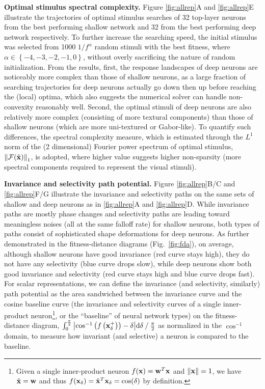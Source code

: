 \documentclass[10pt,twocolumn,letterpaper]{article}
\begin{document}
{\bf Optimal stimulus spectral complexity.} Figure \ref{fig:allrep}A and \ref{fig:allrep}E illustrate the trajectories of optimal stimulus searches of 32 top-layer neurons from the best performing shallow network and 32 from the best performing deep network respectively.
To further increase the searching speed, the initial stimulus {was} selected from 1000 ${1}/{f^{\alpha}}$ random stimuli with the best fitness, where $\alpha \in \left\lbrace -4,-3,-2,-1,0 \right\rbrace$, without overly sacrificing the nature of random initialization.
From the results, first, the response landscapes of deep neurons are noticeably more complex than those of shallow neurons, as a large fraction of searching trajectories for deep neurons actually go down then up before reaching the (local) optima, which also suggests the numerical solver can handle non-convexity reasonably well.
Second, the optimal stimuli of deep neurons are also relatively more complex (\ie consisting of more textural components) than those of shallow neurons (which are more uni-textured or Gabor-like).
To quantify such differences, the spectral complexity measure, which is estimated through the $L^{1}$ norm of the (2 dimensional) Fourier power spectrum of optimal stimulus, \ie $\left\| \mathcal{F}(\hat{\bf{x}}) \right\|_{1}$, is adopted, where higher value suggests higher non-sparsity (\ie more spectral components required to represent the visual stimuli).

\newcommand{\defbaseline}{Given a single inner-product neuron $f({\bf{x}}) = {\bf{w}}^{T}{\bf{x}}$ and $\left\| \bf{x} \right\| = 1$, we have $\hat{\bf{x}} = \bf{w}$ and thus $f({\bf{x}}_{\delta}) = {\hat{\bf{x}}}^{T}{\bf{x}}_{\delta} = \cos(\delta)$ by definition.}

{\bf Invariance and selectivity path potential.} Figure \ref{fig:allrep}B/C and \ref{fig:allrep}F/G illustrate the invariance and selectivity paths on the same sets of shallow and deep neurons as in \ref{fig:allrep}A and \ref{fig:allrep}D.
While invariance paths are mostly phase changes and selectivity paths are leading toward meaningless noises (all at the same falloff rate) for shallow neurons, both types of paths consist of sophisticated shape deformations for deep neurons.
As further demonstrated in the fitness-distance diagrams \cite{jones1995fitness} (Fig.~\ref{fig:fda}), on average, although shallow neurons have good invariance (\ie red curve stays high), they do not have any selectivity (\ie blue curve drops slow), while deep neurons show both good invariance and selectivity (\ie red curve stays high and blue curve drops fast).
For scalar representations, we can define the invariance (and selectivity, similarly) path potential as the area sandwiched between the invariance curve and the cosine baseline curve (\ie the invariance and selectivity curves of a single inner-product neuron\footnote{\defbaseline}, or the ``baseline'' of neural network types) on the fitness-distance diagram, \ie $\int_{0}^{\frac{\pi}{2}}{\left| \cos^{-1}\left(f\left( \bf{x}^{+}_{\delta} \right)\right) - \delta \right|}\mathrm{d}\delta \mathbin{/} {\frac{\pi}{2}}$ as normalized in the $\cos^{-1}$ domain, to measure how invariant (and selective) a neuron is compared to the baseline.
\end{document}
